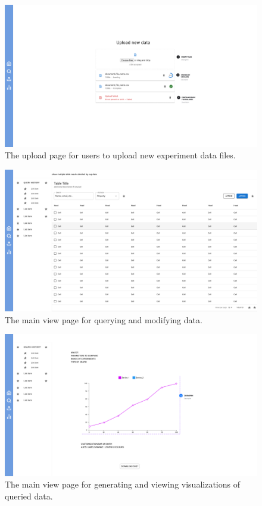 \documentclass[12pt, titlepage]{article}
\begin{document}
\begin{figure}[htbp]
  \centering
  \includegraphics[width=\textwidth]{Figma/upload.pdf}
  \caption{The upload page for users to upload new experiment data files.}
  \label{fig:FigUIUP}
\end{figure}

\begin{figure}[htbp]
  \centering
  \includegraphics[width=\textwidth]{Figma/table.pdf}
  \caption{The main view page for querying and modifying data.}
  \label{fig:FigUITB}
\end{figure}

\begin{figure}[htbp]
  \centering
  \includegraphics[width=\textwidth]{Figma/graphs.pdf}
  \caption{The main view page for generating and viewing visualizations of queried data.}
  \label{fig:FigUIG}
\end{figure}
\end{document}
